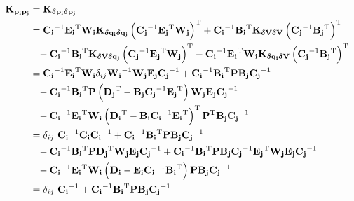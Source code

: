 \documentclass[12pt,a4paper]{scrarticle}
\begin{document}
\begin{align*}
    \CrossCovMat{p_i}{p_j}
        &= \CrossCovMat{\dpBilloir{i}}{\dpBilloir{j}} \\
        &= \CBilloir{i}^{-1} \EBilloir{i}^\transpose \WBilloir{i} \CrossCovMat{\dqBilloir{i}}{\dqBilloir{j}} \left( \CBilloir{j}^{-1} \EBilloir{j}^\transpose \WBilloir{j} \right)^\transpose + \CBilloir{i}^{-1} \BBilloir{i}^\transpose \CovMat{\dVBilloir} \left(\CBilloir{j}^{-1} \BBilloir{j}^\transpose\right)^\transpose \\
        &\hphantom{=}- \CBilloir{i}^{-1} \BBilloir{i}^\transpose \CrossCovMat{\dVBilloir}{\dqBilloir{j}} \left( \CBilloir{j}^{-1} \EBilloir{j}^\transpose \WBilloir{j} \right)^\transpose - \CBilloir{i}^{-1} \EBilloir{i}^\transpose \WBilloir{i} \CrossCovMat{\dqBilloir{i}}{\dVBilloir} \left(\CBilloir{j}^{-1} \BBilloir{j}^\transpose\right)^\transpose \\
        &= \CBilloir{i}^{-1} \EBilloir{i}^\transpose \WBilloir{i} \delta_{ij} \WBilloir{i}^{-1} \WBilloir{j} \EBilloir{j} \CBilloir{j}^{-1} + \CBilloir{i}^{-1} \BBilloir{i}^\transpose \mat{P} \BBilloir{j} \CBilloir{j}^{-1} \\
        &\hphantom{=}- \CBilloir{i}^{-1} \BBilloir{i}^\transpose \mat{P} \left(\DBilloir{j}^\transpose - \BBilloir{j} \CBilloir{j}^{-1} \EBilloir{j}^\transpose\right) \WBilloir{j} \EBilloir{j} \CBilloir{j}^{-1} \\
        &\hphantom{=}- \CBilloir{i}^{-1} \EBilloir{i}^\transpose \WBilloir{i} \left(\DBilloir{i}^\transpose - \BBilloir{i} \CBilloir{i}^{-1} \EBilloir{i}^\transpose\right)^\transpose \mat{P}^\transpose \BBilloir{j} \CBilloir{j}^{-1} \\
        &= \delta_{ij} \ \CBilloir{i}^{-1} \CBilloir{i} \CBilloir{i}^{-1} + \CBilloir{i}^{-1} \BBilloir{i}^\transpose \mat{P} \BBilloir{j} \CBilloir{j}^{-1} \\
        &\hphantom{=}- \CBilloir{i}^{-1} \BBilloir{i}^\transpose \mat{P} \DBilloir{j}^\transpose \WBilloir{j} \EBilloir{j} \CBilloir{j}^{-1} + \CBilloir{i}^{-1} \BBilloir{i}^\transpose \mat{P} \BBilloir{j} \CBilloir{j}^{-1} \EBilloir{j}^\transpose \WBilloir{j} \EBilloir{j} \CBilloir{j}^{-1} \\
        &\hphantom{=}- \CBilloir{i}^{-1} \EBilloir{i}^\transpose \WBilloir{i} \left(\DBilloir{i} - \EBilloir{i} \CBilloir{i}^{-1} \BBilloir{i}^\transpose\right) \mat{P} \BBilloir{j} \CBilloir{j}^{-1} \\
        &= \delta_{ij} \ \CBilloir{i}^{-1} + \CBilloir{i}^{-1} \BBilloir{i}^\transpose \mat{P} \BBilloir{j} \CBilloir{j}^{-1} \\

\end{align*}
\end{document}
